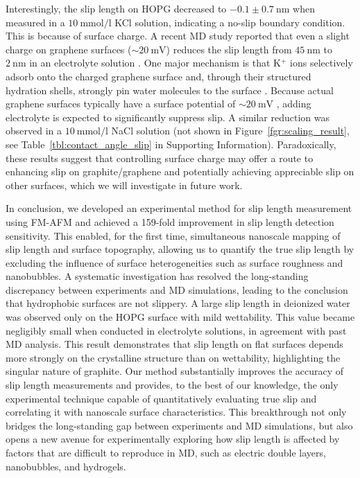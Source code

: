 \documentclass[journal=jacsat,manuscript=article]{achemso}
\begin{document}
Interestingly, the slip length on HOPG decreased to \(-0.1 \pm \SI{0.7}{\nano\metre}\) when measured in a \(\SI{10}{\milli\mole\per\litre}\) KCl solution, indicating a no-slip boundary condition. This is because of surface charge. A recent MD study reported that even a slight charge on graphene surfaces (\(\sim\SI{20}{\milli\volt}\)) reduces the slip length from \(\SI{45}{\nano\metre}\) to \(\SI{2}{\nano\metre}\) in an electrolyte solution \cite{Xie2020-as}. One major mechanism is that K\(^+\) ions selectively adsorb onto the charged graphene surface and, through their structured hydration shells, strongly pin water molecules to the surface \cite{Mu2021-wm}. Because actual graphene surfaces typically have a surface potential of \(\sim\SI{20}{\milli\volt}\) \cite{Paruchuri2004-iu}, adding electrolyte is expected to significantly suppress slip. A similar reduction was observed in a \(\SI{10}{\milli\mole\per\litre}\) NaCl solution (not shown in Figure~\ref{fgr:scaling_result}, see Table~\ref{tbl:contact_angle_slip} in Supporting Information). Paradoxically, these results suggest that controlling surface charge may offer a route to enhancing slip on graphite/graphene and potentially achieving appreciable slip on other surfaces, which we will investigate in future work.

In conclusion, we developed an experimental method for slip length measurement using FM-AFM and achieved a 159-fold improvement in slip length detection sensitivity. This enabled, for the first time, simultaneous nanoscale mapping of slip length and surface topography, allowing us to quantify the true slip length by excluding the influence of surface heterogeneities such as surface roughness and nanobubbles. A systematic investigation has resolved the long-standing discrepancy between experiments and MD simulations, leading to the conclusion that hydrophobic surfaces are not slippery. A large slip length in deionized water was observed only on the HOPG surface with mild wettability. This value became negligibly small when conducted in electrolyte solutions, in agreement with past MD analysis. This result demonstrates that slip length on flat surfaces depends more strongly on the crystalline structure than on wettability, highlighting the singular nature of graphite. Our method substantially improves the accuracy of slip length measurements and provides, to the best of our knowledge, the only experimental technique capable of quantitatively evaluating true slip and correlating it with nanoscale surface characteristics. This breakthrough not only bridges the long-standing gap between experiments and MD simulations, but also opens a new avenue for experimentally exploring how slip length is affected by factors that are difficult to reproduce in MD, such as electric double layers, nanobubbles, and hydrogels. 
\end{document}
